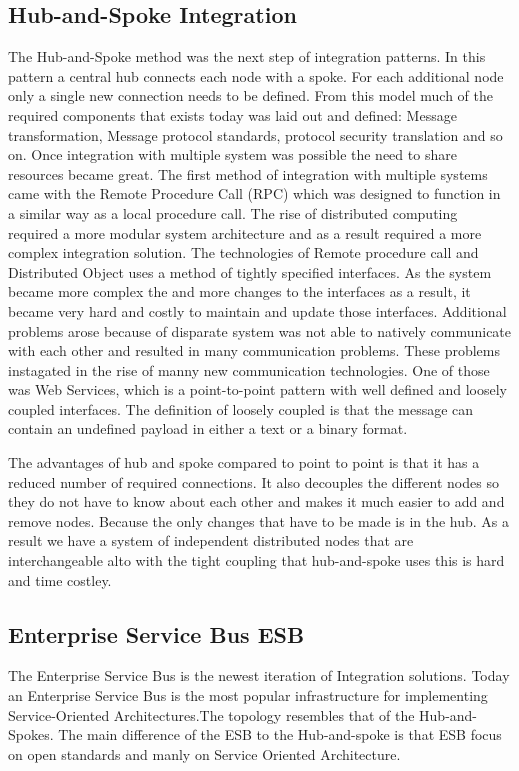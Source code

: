 \documentclass{llncs}
\begin{document}
\subsection{Hub-and-Spoke Integration}
The Hub-and-Spoke\cite{risimic06,hasptp} method was the next step of integration patterns. In this pattern a central hub connects each node with a spoke. For each additional node only a single new connection needs to be defined. From this model much of the required components that exists today was laid out and defined: Message transformation, Message protocol standards, protocol security translation and so on. Once integration with multiple system was possible the need to share resources became great. The first method of integration with multiple systems came with the Remote Procedure Call (RPC) which was designed to function in a similar way as a local procedure call. The rise of distributed computing required a more modular system architecture and as a result required a more complex integration solution. The technologies of Remote procedure call and Distributed Object uses a method of tightly specified interfaces. As the system became more complex the and more changes to the interfaces as a result, it became very hard and costly to maintain and update those interfaces. Additional problems arose because of disparate system was not able to natively communicate with each other and resulted in many communication problems. These problems instagated in the rise of manny new communication technologies. One of those was Web Services, which is a point-to-point pattern with well defined and loosely coupled interfaces. The definition of loosely coupled is that the message can contain an undefined payload in either a text or a binary format.

The advantages of hub and spoke compared to point to point is that it has a reduced number of required connections. It also decouples the different nodes so they do not have to know about each other and makes it much easier to add and remove nodes. Because the only changes that have to be made is in the hub. As a result we have a system of independent distributed nodes that are interchangeable alto with the tight coupling that hub-and-spoke uses this is hard and time costley.

\subsection{Enterprise Service Bus ESB}
The Enterprise Service Bus is the newest iteration of Integration solutions. Today an Enterprise Service Bus is the most popular infrastructure for implementing Service-Oriented Architectures\cite{esb}.The topology resembles that of the Hub-and-Spokes. The main difference of the ESB to the Hub-and-spoke is that ESB focus on open standards and manly on Service Oriented Architecture.
\end{document}
